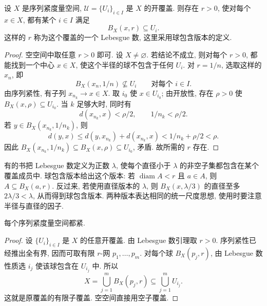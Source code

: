 \begin{lemma}
\label{ch:compact:lebesgue}
设 $X$ 是序列紧度量空间, $\mathcal U=\{U_i\}_{i\in I}$ 是 $X$ 的开覆盖. 则存在 $r>0$, 使对每个 $x\in X$, 都有某个 $i\in I$ 满足
\[
 B_X(x,r)\subseteq U_i.
\]
这样的 $r$ 称为这个覆盖的一个 Lebesgue 数, 这里采用球包含版本的定义.
\end{lemma}
\begin{proof}
空空间中取任意 $r>0$ 即可. 设 $X\ne\varnothing$. 若结论不成立, 则对每个 $r>0$, 都能找到一个中心 $x\in X$, 使这个半径的球不包含于任何 $U_i$. 对 $r=1/n$, 选取这样的 $x_n$, 即
\[
 B_X(x_n,1/n)\not\subseteq U_i
 \qquad\text{对每个 }i\in I.
\]
由序列紧性, 有子列 $x_{n_k}\to x\in X$. 取 $i_0$ 使 $x\in U_{i_0}$; 由开放性, 存在 $\rho>0$ 使 $B_X(x,\rho)\subseteq U_{i_0}$. 当 $k$ 足够大时, 同时有
\[
 d(x_{n_k},x)<\rho/2,\qquad 1/n_k<\rho/2.
\]
若 $y\in B_X(x_{n_k},1/n_k)$, 则
\[
 d(y,x)\leq d(y,x_{n_k})+d(x_{n_k},x)
 <1/n_k+\rho/2<\rho.
\]
因此 $B_X(x_{n_k},1/n_k)\subseteq B_X(x,\rho)\subseteq U_{i_0}$, 矛盾. 故所需的 $r$ 存在.
\end{proof}

\begin{remark}
有的书把 Lebesgue 数定义为正数 $\lambda$, 使每个直径小于 $\lambda$ 的非空子集都包含在某个覆盖成员中. 球包含版本给出这个版本: 若 $\operatorname{diam}A<r$ 且 $a\in A$, 则 $A\subseteq B_X(a,r)$. 反过来, 若使用直径版本的 $\lambda$, 则 $B_X(x,\lambda/3)$ 的直径至多 $2\lambda/3<\lambda$, 从而得到球包含版本. 两种版本表达相同的统一尺度思想, 使用时要注意半径与直径的因子.
\end{remark}

\begin{theorem}[序列紧性推出紧性]
\label{ch:compact:sequential-to-compact}
每个序列紧度量空间都紧.
\end{theorem}
\begin{proof}
设 $\{U_i\}_{i\in I}$ 是 $X$ 的任意开覆盖. 由 Lebesgue 数引理取 $r>0$. 序列紧性已经推出全有界, 因而可取有限 $r$-网 $p_1,\ldots,p_m$. 对每个球 $B_X(p_j,r)$, 由 Lebesgue 数性质选 $i_j$ 使该球包含在 $U_{i_j}$ 中. 所以
\[
 X=\bigcup_{j=1}^mB_X(p_j,r)
 \subseteq\bigcup_{j=1}^mU_{i_j}.
\]
这就是原覆盖的有限子覆盖. 空空间直接用空子覆盖.
\end{proof}

